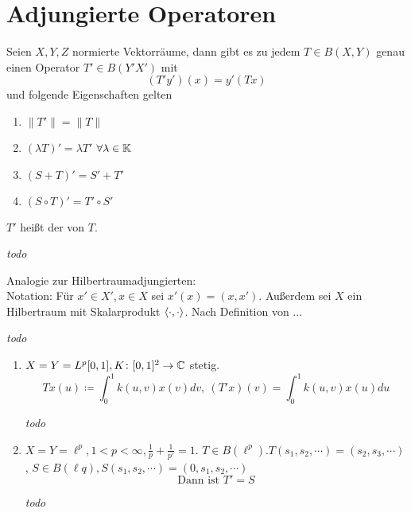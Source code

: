 

\section{Adjungierte Operatoren}


\begin{satz}
	Seien $X, Y, Z$ normierte Vektorräume, dann gibt es zu jedem $T \in B(X, Y)$ genau einen Operator $T' \in B(Y' X')$ mit 
	\[ (T' y')(x) = y'(T x) \]
	und folgende Eigenschaften gelten
	\begin{enumerate}[label=(\roman*\upshape)]
		\item $\| T' \| = \| T \|$
		\item $( \lambda T )' = \lambda T'$ $\forall \lambda \in \mathbb{K}$
		\item $(S + T)' = S' + T'$
		\item $(S \circ T)' = T' \circ S'$
	\end{enumerate}	
	$T'$ hei{\ss}t der  von $T$.
\end{satz}

\begin{beweis}
	\textit{todo} %
\end{beweis}


\begin{bemerkung}
	Analogie zur Hilbertraumadjungierten: \\
	Notation: Für $x' \in X', x \in X$ sei $x'(x) = (x, x')$. Außerdem sei $X$ ein Hilbertraum mit Skalarprodukt $\langle \cdot , \cdot \rangle$.  Nach Definition von ... %
\end{bemerkung}

\begin{beweis}
	\textit{todo} %
\end{beweis}


\begin{beispiel}
	\begin{enumerate}[label=\alph*\upshape)]
		\item $X = Y = L^{p}[0, 1], K \colon [0, 1]^{2} \rightarrow \mathbb{C}$ stetig.
			\[ T x(u) \coloneqq \int_{0}^{1} k(u, v) x(v) dv, ~ \left( T' x \right)(v) = \int_{0}^{1} k(u, v) x(u) du \]
		  \begin{beweis}
		  	\textit{todo} %
		  \end{beweis}
		\item $X =Y = \ell^{p}, 1 < p < \infty, \frac{1}{p} + \frac{1}{p'} = 1$. $T \in B(\ell^{p}). T(s_{1}, s_{2}, \cdots) = (s_{2}, s_{3}, \cdots)$, $S \in B(\ell{q}), S(s_{1}, s_{2}, \cdots) = (0, s_{1}, s_{2}, \cdots)$
			\[ \text{Dann ist } T' = S \]
		  \begin{beweis}
		  	\textit{todo} %
		  \end{beweis}
	\end{enumerate}
\end{beispiel}


